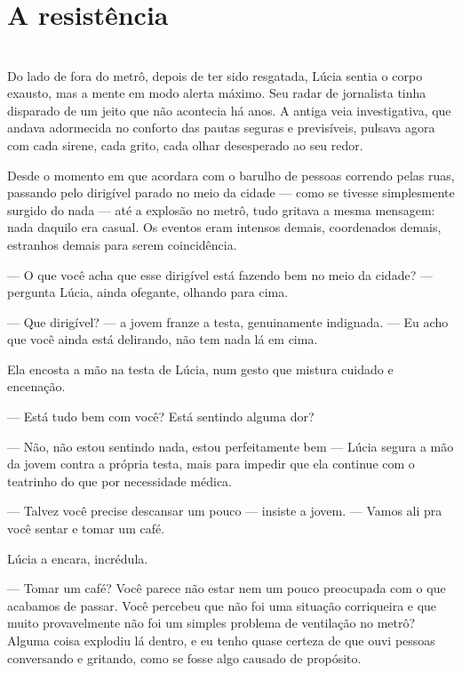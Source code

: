 \newpage
\ifdefined\useChapters
\chapter{A resistência}
\else
\chapter{}
\fi

Do lado de fora do metrô, depois de ter sido resgatada, Lúcia sentia o corpo exausto, mas a mente em modo alerta máximo. Seu radar de jornalista tinha disparado de um jeito que não acontecia há anos. A antiga veia investigativa, que andava adormecida no conforto das pautas seguras e previsíveis, pulsava agora com cada sirene, cada grito, cada olhar desesperado ao seu redor.

Desde o momento em que acordara com o barulho de pessoas correndo pelas ruas, passando pelo dirigível parado no meio da cidade — como se tivesse simplesmente surgido do nada — até a explosão no metrô, tudo gritava a mesma mensagem: nada daquilo era casual.  
Os eventos eram intensos demais, coordenados demais, estranhos demais para serem coincidência.

— O que você acha que esse dirigível está fazendo bem no meio da cidade? — pergunta Lúcia, ainda ofegante, olhando para cima.

— Que dirigível? — a jovem franze a testa, genuinamente indignada. — Eu acho que você ainda está delirando, não tem nada lá em cima.

Ela encosta a mão na testa de Lúcia, num gesto que mistura cuidado e encenação.

— Está tudo bem com você? Está sentindo alguma dor?

— Não, não estou sentindo nada, estou perfeitamente bem — Lúcia segura a mão da jovem contra a própria testa, mais para impedir que ela continue com o teatrinho do que por necessidade médica.

— Talvez você precise descansar um pouco — insiste a jovem. — Vamos ali pra você sentar e tomar um café.

Lúcia a encara, incrédula.

— Tomar um café? Você parece não estar nem um pouco preocupada com o que acabamos de passar.  
Você percebeu que não foi uma situação corriqueira e que muito provavelmente não foi um simples problema de ventilação no metrô?  
Alguma coisa explodiu lá dentro, e eu tenho quase certeza de que ouvi pessoas conversando e gritando, como se fosse algo causado de propósito.

